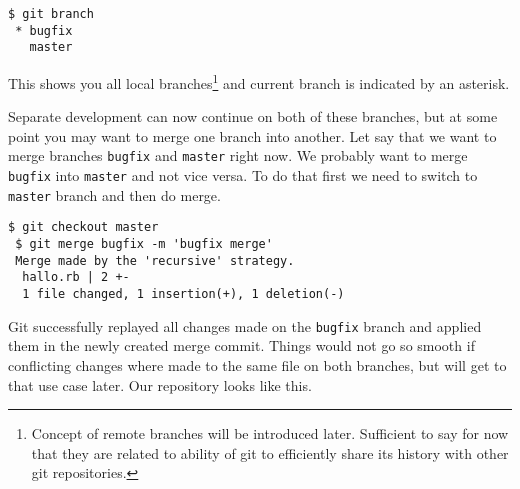\documentclass{article}
\theoremstyle{definition}
\begin{document}
        \begin{Verbatim}[frame=single]
 $ git branch
 * bugfix
   master
        \end{Verbatim}

        \noindent This shows you all local branches\footnote{Concept of remote branches will be introduced later.
        Sufficient to say for now that they are related to ability of git to efficiently share its history with
        other git repositories.} and current branch is indicated by an asterisk.

        Separate development can now continue on both of these branches, but at some point you may want to merge one
        branch into another. Let say that we want to merge branches \texttt{bugfix} and \texttt{master} right now. We
        probably want to merge \texttt{bugfix} into \texttt{master} and not vice versa. To do that first we need to
        switch to \texttt{master} branch and then do merge.
        \begin{Verbatim}[frame=single]
 $ git checkout master
 $ git merge bugfix -m 'bugfix merge'
 Merge made by the 'recursive' strategy.
  hallo.rb | 2 +-
  1 file changed, 1 insertion(+), 1 deletion(-)
        \end{Verbatim}
        Git successfully replayed all changes made on the \texttt{bugfix} branch and applied them in the newly created
        merge commit. Things would not go so smooth if conflicting changes where made to the same file on both branches,
        but will get to that use case later. Our repository looks like this.
\end{document}
